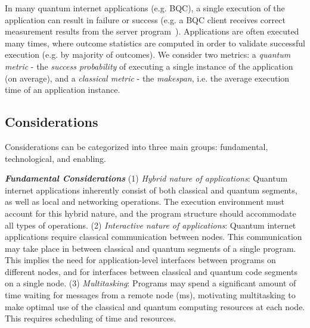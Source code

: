 In many quantum internet applications (e.g. BQC), a single execution of the application can result in failure or success (e.g. a BQC client receives correct measurement results from the server program~\cite{leichtle2021verifying}). Applications are often executed many times, where outcome statistics are computed in order to validate successful execution (e.g. by majority of outcomes).
We consider two metrics:
a \emph{quantum metric} -  the \textit{success probability} of executing a single instance of the application (on average), and a \emph{classical metric} -  the \textit{makespan}, i.e. the average execution time of an application instance.

\subsection{Considerations}
Considerations can be categorized into three main groups: fundamental, technological, and enabling.

\noindent\textit{\textbf{Fundamental Considerations}}
(1) \textit{Hybrid nature of applications}: Quantum internet applications inherently consist of both classical and quantum segments, as well as local and networking operations. The execution environment must account for this hybrid nature, and the program structure should accommodate all types of operations.
(2) \textit{Interactive nature of applications}: Quantum internet applications require classical communication between nodes. This communication may take place in between classical and quantum segments of a single program. 
This implies the need for application-level interfaces between programs on different nodes, and for interfaces between classical and quantum code segments on a single node.
(3) \textit{Multitasking}: Programs may spend a significant amount of time waiting for messages from a remote node (ms), motivating multitasking to make optimal use of the classical and quantum computing resources at each node.  This requires scheduling of time and resources.

